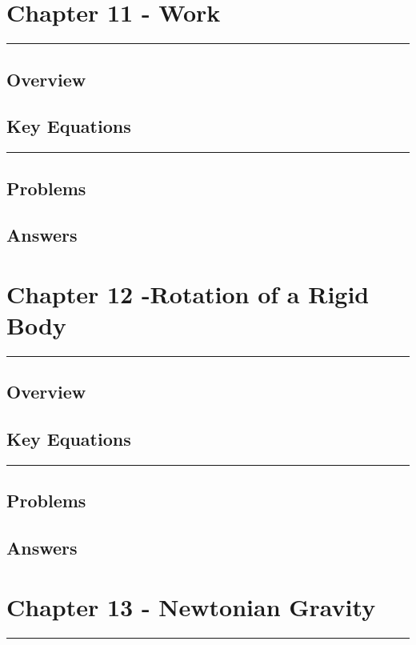 \documentclass[a4paper,12pt]{article}
\begin{document}
\pagebreak
\section*{Chapter 11 - Work}
\rule{\linewidth}{1pt}
\subsection*{Overview}
\subsection*{Key Equations}

\begin{center}
  \rule{6cm}{0.5pt}
\end{center}
\subsection*{Problems}
\subsection*{Answers}

\pagebreak
\section*{Chapter 12 -Rotation of a Rigid Body}
\rule{\linewidth}{1pt}
\subsection*{Overview}
\subsection*{Key Equations}

\begin{center}
  \rule{6cm}{0.5pt}
\end{center}
\subsection*{Problems}
\subsection*{Answers}

\pagebreak
\section*{Chapter 13 - Newtonian Gravity}
\rule{\linewidth}{1pt}
\end{document}
